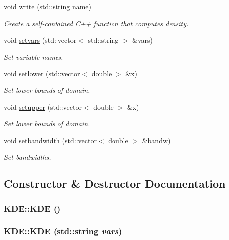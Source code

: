 \begin{CompactItemize}
void \hyperlink{classKDE_a16}{write} (std::string name)
\begin{CompactList}\small\item\em Create a self-contained C++ function that computes density. \item\end{CompactList}\item 
void \hyperlink{classKDE_a17}{setvars} (std::vector$<$ std::string $>$ \&vars)
\begin{CompactList}\small\item\em Set variable names. \item\end{CompactList}\item 
void \hyperlink{classKDE_a18}{setlower} (std::vector$<$ double $>$ \&x)
\begin{CompactList}\small\item\em Set lower bounds of domain. \item\end{CompactList}\item 
void \hyperlink{classKDE_a19}{setupper} (std::vector$<$ double $>$ \&x)
\begin{CompactList}\small\item\em Set lower bounds of domain. \item\end{CompactList}\item 
void \hyperlink{classKDE_a20}{setbandwidth} (std::vector$<$ double $>$ \&bandw)
\begin{CompactList}\small\item\em Set bandwidths. \item\end{CompactList}\end{CompactItemize}


\subsection{Constructor \& Destructor Documentation}
\hypertarget{classKDE_a0}{
\subsubsection[KDE]{\setlength{\rightskip}{0pt plus 5cm}KDE::KDE ()}}
\label{classKDE_a0}


\hypertarget{classKDE_a1}{
\subsubsection[KDE]{\setlength{\rightskip}{0pt plus 5cm}KDE::KDE (std::string {\em vars})}}
\label{classKDE_a1}


